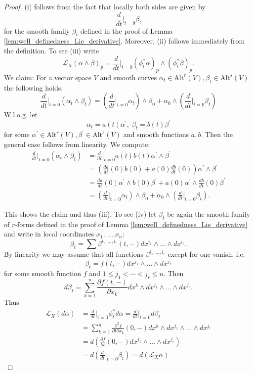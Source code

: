 \begin{proof}
    (i) follows from the fact that locally both sides are given by 
    \[
        \frac{d}{dt}\bigg|_{t=0} \beta_t
    \]
    for the smooth family $\beta_t$ defined in the proof of Lemma \ref{lem:well_definedness_Lie_derivative}. Moreover, (ii) follows immediately from the definition. To see (iii) write
    \[
    \mathcal{L}_X(\alpha \wedge \beta)_p = \frac{d}{dt}\bigg|_{t=0} (\phi_t^\ast\alpha)_p \wedge (\phi_t^\ast\beta)_p.
    \] 
    We claim: For a vector space $V$ and smooth curves $\alpha_t \in \mathrm{Alt}^r(V), \beta_t \in \mathrm{Alt}^s(V)$ the following holds:
    \[
        \frac{d}{dt}\bigg|_{t=0}(\alpha_t\wedge\beta_t) = \left(\frac{d}{dt}\bigg|_{t=0} \alpha_t\right) \wedge \beta_0 + \alpha_0 \wedge \left(\frac{d}{dt}\bigg|_{t=0} \beta_t\right)
    \]
    W.l.o.g. let 
    \[
    \alpha_t = a(t) \alpha^\prime, \; \beta_t = b(t) \beta^\prime 
    \]
    for some $\alpha^\prime \in \mathrm{Alt}^r(V), \beta^\prime \in \mathrm{Alt}^s(V)$ and smooth functions $a,b$. Then the general case follows from linearity. We compute:
    \begin{align*}
        \frac{d}{dt}\bigg|_{t=0}(\alpha_t \wedge \beta_t) &= \frac{d}{dt}\bigg|_{t=0} a(t)b(t)\alpha^\prime \wedge \beta^\prime\\
        &= \left( \frac{da}{dt}(0)b(0) + a(0)\frac{db}{dt}(0) \right)\alpha^\prime \wedge \beta^\prime\\
        &=\frac{da}{dt}(0) \alpha^\prime \wedge b(0)\beta^\prime + a(0)\alpha^\prime \wedge \frac{db}{dt}(0)\beta^\prime\\
        &= \left(\frac{d}{dt}\bigg|_{t=0} \alpha_t\right) \wedge \beta_0 + \alpha_0 \wedge \left(\frac{d}{dt}\bigg|_{t=0} \beta_t\right).
    \end{align*}

    This shows the claim and thus (iii). To see (iv) let $\beta_t$ be again the smooth family of $r$-forms defined in the proof of Lemma \ref{lem:well_definedness_Lie_derivative} and write in local coordinates $x_1,\ldots,x_n$:
    \[
    \beta_t = \sum \beta^{i_1,\ldots,i_r}(t,-)dx^{i_1} \wedge \ldots \wedge dx^{i_r}.
    \]
    By linearity we may assume that all functions $\beta^{i_1,\ldots,i_r}$ except for one vanish, i.e.
    \[
    \beta_t = f(t,-)dx^{j_1} \wedge \ldots \wedge dx^{j_r}
    \]
    for some smooth function $f$ and $1 \leq j_1 < \cdots < j_r \leq n$.
    Then
    \[
    d\beta_t = \sum_{k=1}^n \frac{\partial f(t,-)}{\partial x_k} dx^k \wedge dx^{j_1} \wedge \ldots \wedge dx^{j_r}.
    \]
    Thus
    \begin{align*}
        \mathcal{L}_X(d\alpha) &= \frac{d}{dt}\bigg|_{t=0} \phi_t^\ast d\alpha = \frac{d}{dt}\bigg|_{t=0} d\beta_t \\
        &= \sum_{k=1}^n \frac{\partial^2 f}{\partial t\partial x_k}(0,-) dx^k \wedge dx^{j_1} \wedge \ldots \wedge dx^{j_r} \\
        &= d \left(\frac{\partial f}{\partial t}(0,-) dx^{j_1} \wedge \ldots \wedge dx^{j_r}\right) \\
        &= d(\frac{d}{dt}\bigg|_{t=0} \beta_t) = d(\mathcal{L}_X\alpha)
    \end{align*}

\end{proof}

